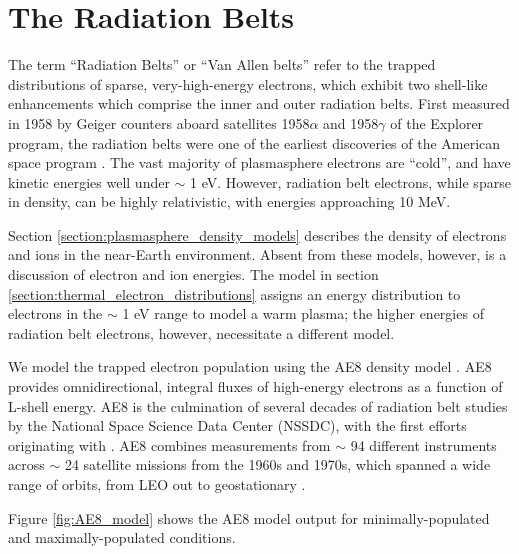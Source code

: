 \section{The Radiation Belts}
The term ``Radiation Belts'' or ``Van Allen belts'' refer to the trapped distributions of sparse, very-high-energy electrons, which exhibit two shell-like enhancements which comprise the inner and outer radiation belts. First measured in 1958 by Geiger counters aboard satellites 1958$\alpha$ and 1958$\gamma$ of the Explorer program, the radiation belts were one of the earliest discoveries of the American space program \citep{VanAllen1958}. The vast majority of plasmasphere electrons are ``cold'', and have kinetic energies well under $\sim$ 1 eV. However, radiation belt electrons, while sparse in density, can be highly relativistic, with energies approaching 10 MeV.

Section \ref{section:plasmasphere_density_models} describes the density of electrons and ions in the near-Earth environment. Absent from these models, however, is a discussion of electron and ion energies. The model in section \ref{section:thermal_electron_distributions} assigns an energy distribution to electrons in the $\sim$ 1 eV range to model a warm plasma; the higher energies of radiation belt electrons, however, necessitate a different model.

We model the trapped electron population using the AE8 density model \citep{Vette1991}. AE8 provides omnidirectional, integral fluxes of high-energy electrons as a function of L-shell energy. AE8 is the culmination of several decades of radiation belt studies by the National Space Science Data Center (NSSDC), with the first efforts originating with \cite{Vette1966}. AE8 combines measurements from $\sim$ 94 different instruments across $\sim$ 24 satellite missions from the 1960s and 1970s, which spanned a wide range of orbits, from LEO out to geostationary \citep{Cayton2005}.

Figure \ref{fig:AE8_model} shows the AE8 model output for minimally-populated and maximally-populated conditions. 

